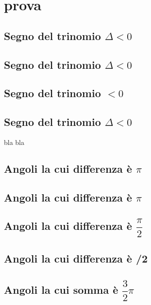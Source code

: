 \documentclass{book}
\begin{document}
		\tableofcontents
	\chapter{prova}
	\section{Segno del trinomio \texorpdfstring{$\Delta<0$}{delta $<0$}}
	\section{Segno del trinomio  $\Delta<0$}
	\section{Segno del trinomio  \textDelta $<0$}
	\section{Segno del trinomio \texorpdfstring{$\Delta<0$}{\textDelta $<0$}}
	bla bla
	\section{Angoli la cui differenza è $\pi$}
	\section{Angoli la cui differenza è \texorpdfstring{$\pi$}{\textpi}}
	\section{Angoli la cui differenza è \texorpdfstring{$\dfrac{\pi}{2}$}{\textpi/2}}
	\section{Angoli la cui differenza è \textpi/2}
	\section{Angoli la cui somma è $\dfrac{3}{2}\pi$}
	
\end{document}
